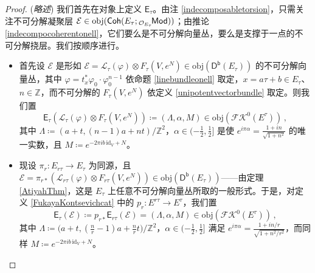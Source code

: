 \begin{proof}(\textit{略述})
我们首先在对象上定义 $\mathsf{E}_\tau$。由注 \ref{indecomposabletorsion}，只需关注不可分解凝聚层 $\mathcal{E}\in\textup{obj}(\mathsf{Coh}(E_\tau;{}_{\mathcal{O}_{E_\tau}}\!\mathsf{Mod}))$；由推论 \ref{indecompocoherentonell}，它们要么是不可分解向量丛，要么是支撑于一点的不可分解挠层。我们按顺序进行。
\begin{itemize}[leftmargin=0.5cm]
	\item 首先设 $\mathcal{E}$ 是形如 $\mathcal{E}=\mathcal{L}_\tau(\varphi)\otimes F_\tau(V,e^N)\in\text{obj}(\mathsf{D^b}(E_\tau))$ 的不可分解向量丛，其中 $\varphi=t_x^*\varphi_0\cdot\varphi_0^{n-1}$ 依命题 \ref{linebundleonell} 取定，$x=a\tau+b\in E_\tau$、$n\in\mathbb{Z}$，而不可分解的 $F_\tau(V,e^N)$ 依定义 \ref{unipotentvectorbundle} 取定。则我们置 
	\[
	\mathsf{E}_\tau(\mathcal{L}_\tau(\varphi)\otimes F_\tau(V,e^N))\coloneqq(\Lambda,\alpha,M)\in\text{obj}(\mathscr{F\!K}^0(E^\tau))\,,
	\]
	其中 $\Lambda\coloneqq(a+t,(n-1)a+nt)/\mathbb{Z}^2$，$\alpha\in(-\frac{1}{2},\frac{1}{2}]$ 是使 $e^{i\pi\alpha}=\frac{1+in}{\sqrt{1+n^2}}$ 的唯一实数，且 $M\coloneqq e^{-2\pi i b\,\text{id}_V + N}$。
	
	\item 现设 $\pi_r:E_{r\tau}\rightarrow E_\tau$ 为同源，且 $\mathcal{E}=\pi_{r*}(\mathcal{L}_{r\tau}(\varphi)\otimes F_{r\tau}(V,e^N))\in\text{obj}(\mathsf{D^b}(E_{\tau}))$——由定理 \ref{AtiyahThm}，这是 $E_\tau$ 上任意不可分解向量丛所取的一般形式。于是，对定义 \ref{FukayaKontsevichcat} 中的 $p_r:E^{r\tau}\rightarrow E^\tau$，我们置
	\[
	\mathsf{E}_\tau(\mathcal{E})\coloneqq p_{r*}\mathsf{E}_{r\tau}(\mathcal{E})=(\Lambda,\alpha,M)\in\text{obj}(\mathscr{F\!K}^0(E^\tau))\,,
	\]
	其中 $\Lambda\coloneqq\big(a+t,(\frac{n}{r}-1)a+\frac{n}{r}t\big)/\mathbb{Z}^2$，$\alpha\in(-\frac{1}{2},\frac{1}{2}]$ 满足 $e^{i\pi\alpha}=\frac{1+in/r}{\sqrt{1+n^2/r^2}}$，而同样 $M\coloneqq e^{-2\pi i b\,\text{id}_V + N}$。
	

\end{itemize}
\end{proof}

